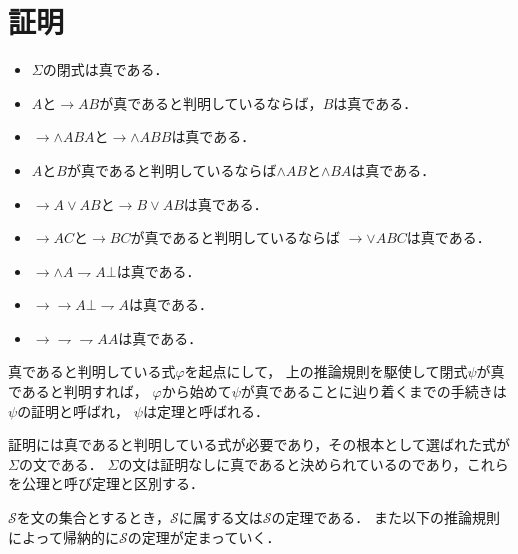 \section{証明}
	
	\begin{itemize}
		\item $\Sigma$の閉式は真である．
		\item $A$と$\rightarrow AB$が真であると判明しているならば，$B$は真である．
		\item $\rightarrow \wedge ABA$と$\rightarrow \wedge ABB$は真である．
		\item $A$と$B$が真であると判明しているならば$\wedge AB$と$\wedge BA$は真である．
		\item $\rightarrow A\vee AB$と$\rightarrow B \vee AB$は真である．
		\item $\rightarrow AC$と$\rightarrow BC$が真であると判明しているならば
			$\rightarrow \vee ABC$は真である．
		\item $\rightarrow\wedge A \rightharpoondown A \bot$は真である．
		\item $\rightarrow \rightarrow A \bot \rightharpoondown A$は真である．
		\item $\rightarrow \rightharpoondown\rightharpoondown AA$は真である．
	\end{itemize}
	
	真であると判明している式$\varphi$を起点にして，
	上の推論規則を駆使して閉式$\psi$が真であると判明すれば，
	$\varphi$から始めて$\psi$が真であることに辿り着くまでの手続きは$\psi$の証明と呼ばれ，
	$\psi$は定理と呼ばれる．
	
	証明には真であると判明している式が必要であり，その根本として選ばれた式が$\Sigma$の文である．
	$\Sigma$の文は証明なしに真であると決められているのであり，これらを公理と呼び定理と区別する．
	
	$\mathscr{S}$を文の集合とするとき，$\mathscr{S}$に属する文は$\mathscr{S}$の定理である．
	また以下の推論規則によって帰納的に$\mathscr{S}$の定理が定まっていく．
	

